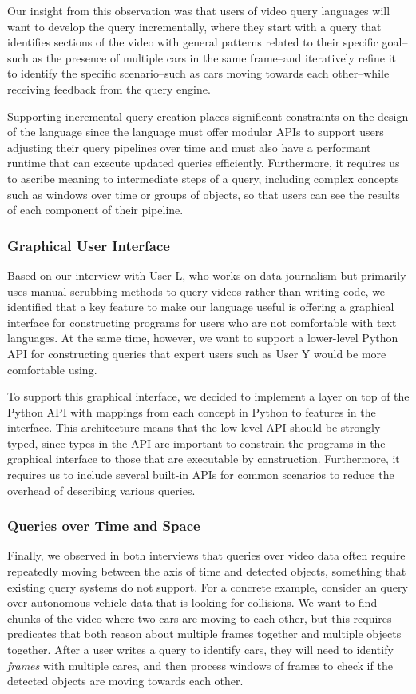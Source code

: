 Our insight from this observation was that users of video query languages will want to develop the query incrementally, where they start with a query that identifies sections of the video with general patterns related to their specific goal--such as the presence of multiple cars in the same frame--and iteratively refine it to identify the specific scenario--such as cars moving towards each other--while receiving feedback from the query engine.

Supporting incremental query creation places significant constraints on the design of the language since the language must offer modular APIs to support users adjusting their query pipelines over time and must also have a performant runtime that can execute updated queries efficiently. Furthermore, it requires us to ascribe meaning to intermediate steps of a query, including complex concepts such as windows over time or groups of objects, so that users can see the results of each component of their pipeline.

\subsubsection{Graphical User Interface}
Based on our interview with User L, who works on data journalism but primarily uses manual scrubbing methods to query videos rather than writing code, we identified that a key feature to make our language useful is offering a graphical interface for constructing programs for users who are not comfortable with text languages. At the same time, however, we want to support a lower-level Python API for constructing queries that expert users such as User Y would be more comfortable using.

To support this graphical interface, we decided to implement a layer on top of the Python API with mappings from each concept in Python to features in the interface. This architecture means that the low-level API should be strongly typed, since types in the API are important to constrain the programs in the graphical interface to those that are executable by construction. Furthermore, it requires us to include several built-in APIs for common scenarios to reduce the overhead of describing various queries.

\subsubsection{Queries over Time and Space}
Finally, we observed in both interviews that queries over video data often require repeatedly moving between the axis of time and detected objects, something that existing query systems do not support. For a concrete example, consider an query over autonomous vehicle data that is looking for collisions. We want to find chunks of the video where two cars are moving to each other, but this requires predicates that both reason about multiple frames together and multiple objects together. After a user writes a query to identify cars, they will need to identify \emph{frames} with multiple cares, and then process windows of frames to check if the detected objects are moving towards each other.

